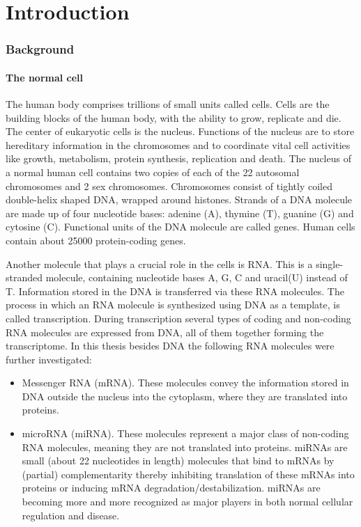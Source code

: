 \chapter{Introduction}
\label{chapter:introduction}

\graphicspath{{Chapter1/Figs/}{Chapter1/Figs/PDF/}{Chapter1/Figs/}}%

\subsection{Background}

\subsubsection{The normal cell}

  The human body comprises trillions of small units called cells. Cells are the building blocks of the human body, with the ability to grow, replicate and die. The center of eukaryotic cells is the nucleus. Functions of the nucleus are to store hereditary information in the chromosomes and to coordinate vital cell activities like growth, metabolism, protein synthesis, replication and death. The nucleus of a normal human cell contains two copies of each of the 22 autosomal chromosomes and 2 sex chromosomes. Chromosomes consist of tightly coiled double-helix shaped DNA, wrapped around histones. Strands of a DNA molecule are made up of four nucleotide bases: adenine (A), thymine (T), guanine (G) and cytosine (C). Functional units of the DNA molecule are called genes. Human cells contain about 25000 protein-coding genes. 

  Another molecule that plays a crucial role in the cells is RNA. This is a single-stranded molecule, containing nucleotide bases A, G, C and uracil(U) instead of T. Information stored in the DNA is transferred via these RNA molecules. The  process in which an RNA molecule is synthesized using DNA as a template, is called transcription. During transcription several types of coding and non-coding RNA molecules are expressed from DNA, all of them together forming the transcriptome. In this thesis besides DNA the following RNA molecules were further investigated:
\begin{itemize}
\item Messenger RNA (mRNA). These molecules convey the information stored in DNA outside the nucleus into the cytoplasm, where they are translated into proteins.
\item microRNA (miRNA). These molecules represent a major class of non-coding RNA molecules, meaning they are not translated into proteins. miRNAs are small (about 22 nucleotides in length) molecules that bind to mRNAs by (partial) complementarity thereby inhibiting translation of these mRNAs into proteins or inducing mRNA degradation/destabilization. miRNAs are becoming more and more recognized as major players in both normal cellular regulation and disease.
\end{itemize}


